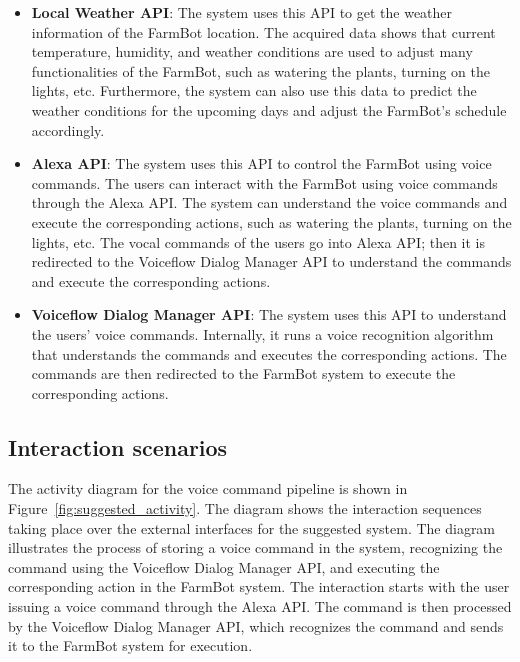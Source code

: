 \begin{itemize}
    \item \textbf{Local Weather API}: The system uses this API to get the weather information of the FarmBot location. The acquired data shows that current temperature, humidity, and weather conditions are used to adjust many functionalities of the FarmBot, such as watering the plants, turning on the lights, etc. Furthermore, the system can also use this data to predict the weather conditions for the upcoming days and adjust the FarmBot's schedule accordingly.
    \item \textbf{Alexa API}: The system uses this API to control the FarmBot using voice commands. The users can interact with the FarmBot using voice commands through the Alexa API. The system can understand the voice commands and execute the corresponding actions, such as watering the plants, turning on the lights, etc. The vocal commands of the users go into Alexa API; then it is redirected to the Voiceflow Dialog Manager API to understand the commands and execute the corresponding actions.
    \item \textbf{Voiceflow Dialog Manager API}: The system uses this API to understand the users' voice commands. Internally, it runs a voice recognition algorithm that understands the commands and executes the corresponding actions. The commands are then redirected to the FarmBot system to execute the corresponding actions.
\end{itemize}


\subsection{Interaction scenarios}
The activity diagram for the voice command pipeline is shown in Figure~\ref{fig:suggested_activity}. The diagram shows the interaction sequences taking place over the external interfaces for the suggested system. The diagram illustrates the process of storing a voice command in the system, recognizing the command using the Voiceflow Dialog Manager API, and executing the corresponding action in the FarmBot system. The interaction starts with the user issuing a voice command through the Alexa API. The command is then processed by the Voiceflow Dialog Manager API, which recognizes the command and sends it to the FarmBot system for execution.

